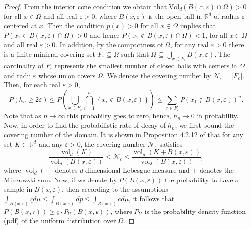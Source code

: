 \documentclass{article}
\begin{document}
\begin{proof}
    From the interior cone condition we obtain that $ \text{Vol}_d(B(x,\varepsilon)\cap \Omega) >0$ for all $x\in \Omega$ and all real $\varepsilon>0$, 
    where $B(x,\varepsilon)$ is the open ball in $\mathbb{R}^d$ of radius $\varepsilon$ centered at $x$. Then the condition $p(x)>0$ for all $x\in \Omega$ implies that $P(x_1\in B(x,\varepsilon)\cap \Omega)>0$ and hence $P(x_1\notin B(x,\varepsilon)\cap \Omega)<1$, for all $x\in \Omega$ and all real $\varepsilon>0$. 
    In addition, by the compactness of $\Omega$, for any real $\varepsilon>0$ there is a finite minimal covering set $F_\varepsilon\subseteq \Omega$ such that $\Omega\subseteq \bigcup_{x\in F_\varepsilon}B(x,\varepsilon)$. The cardinality of $F_\varepsilon$ represents the smallest number of closed balls with centers in $\Omega$ and radii $\varepsilon$ whose union covers $\Omega$. We denote the covering number by $\mathcal{N}_\varepsilon = |F_\varepsilon|$. 
    Then, for each real $\varepsilon>0$,
    \begin{equation}
        P\left(h_n \geq 2 \varepsilon\right) \leq P\left(\bigcup_{x \in F_{\varepsilon}} \bigcap_{i=1}^n\left\{x_i \notin B(x,\varepsilon)\right\}\right) \leq \sum_{x \in F_{\varepsilon}} P\left(x_1 \notin B(x,\varepsilon)\right)^n.
        \label{gamma>2eps}
    \end{equation}
Note that as $n\rightarrow \infty$ this probabilty goes to zero, hence, $h_n\rightarrow 0$ in probability. \\
Now, in order to find the probabilistic rate of decay of $h_n$, we first bound the covering number of the domain.
It is shown in Proposition 4.2.12 of \cite{vershynin2018high} that for any set $K \subset \mathbb{R}^d$ and any $\varepsilon > 0$, the covering number $\mathcal{N}_\varepsilon$ satisfies
\begin{equation}
    \frac{\operatorname{vol}_d(K)}{\operatorname{vol}_d(B(x, \varepsilon))} \leq \mathcal{N}_\varepsilon \leq \frac{\operatorname{vol}_d(K + B(x, \varepsilon))}{\operatorname{vol}_d(B(x, \varepsilon))},
    \label{Vershynin_prop}
\end{equation}
where $\operatorname{vol}_d(\cdot)$ denotes $d$-dimensional Lebesgue measure and $+$ denotes the Minkowski sum.
Now, if we denote by $P( B(x,\varepsilon))$ the probability to have a sample in $B(x,\varepsilon)$, then according to the assumptions $\int_{B(x,\varepsilon)} \underline{c} d \mu \leq \int_{B(x,\varepsilon)} d p \leq\int_{B(x,\varepsilon)} \bar{c} d \mu$, it follows that $P(B(x,\varepsilon))\geq \underline{c}\cdot P_{U}(B(x,\varepsilon))$, where $P_U$ is the probability density function (pdf) of the uniform distribution over $\Omega$. 

\end{proof}
\end{document}
